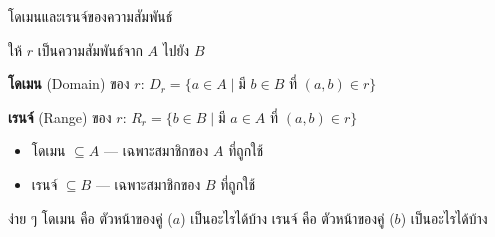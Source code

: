 \documentclass[11pt, aspectratio=169]{beamer}
\begin{document}
\begin{frame}{โดเมนและเรนจ์ของความสัมพันธ์}
  \begin{explanation}[นิยาม]
    ให้ $r$ เป็นความสัมพันธ์จาก $A$ ไปยัง $B$

    \medskip
    \textbf{โดเมน} (Domain) ของ $r$:
    \quad $D_r = \{a \in A \mid \text{มี } b \in B \text{ ที่ } (a,b) \in r\}$

    \medskip
    \textbf{เรนจ์} (Range) ของ $r$:
    \quad $R_r = \{b \in B \mid \text{มี } a \in A \text{ ที่ } (a,b) \in r\}$
  \end{explanation}

  \begin{itemize}
    \item โดเมน $\subseteq A$ — เฉพาะสมาชิกของ $A$ ที่ถูกใช้
    \item เรนจ์ $\subseteq B$ — เฉพาะสมาชิกของ $B$ ที่ถูกใช้
  \end{itemize}

  \begin{intuition}[สังเกต]
    ง่าย ๆ โดเมน คือ ตัวหน้าของคู่ ($a$) เป็นอะไรได้บ้าง เรนจ์ คือ ตัวหน้าของคู่ ($b$) เป็นอะไรได้บ้าง
  \end{intuition}
\end{frame}
\end{document}
